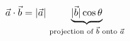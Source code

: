 \documentclass[preview]{standalone}
\begin{document}
\begin{align*}
\special{dvisvgm:raw <g id='unique000'>}\vec{a} \cdot \vec{b} = |\vec{a}|\,\underbrace{|\vec{b}|\cos\theta}_{\text{projection of }\vec{b}\text{ onto }\vec{a}}\special{dvisvgm:raw </g>}
\end{align*}
\end{document}
